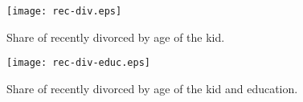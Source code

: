 \documentclass[12pt,letter]{article}
\begin{document}
\newpage


\begin{figure}
\begin{center}
\texttt{[image: rec-div.eps]}
\caption{Share of recently divorced by age of the kid.\label{rec-div}}
\end{center}
\end{figure}
\begin{figure}
\begin{center}
\texttt{[image: rec-div-educ.eps]}
\caption{Share of recently divorced by age of the kid and education.\label{rec-div-educ}}
\end{center}
\end{figure}







\newpage
\end{document}
